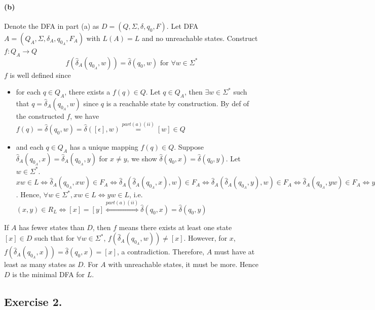 \documentclass[12pt]{article}
\begin{document}
\paragraph*{(b)} Denote the DFA in part (a) as \(D = (Q, \Sigma, \delta, q_{0}, F)\). Let DFA \(A = (Q_{A}, \Sigma, \delta_{A}, q_{0_{A}}, F_{A})\) with \(L(A) = L\) and no unreachable states. Construct \(f : Q_A \to Q\)
\begin{equation*}
  f(\hat{\delta}_A(q_{0_{A}}, w)) = \hat{\delta}(q_0, w) \text{ for } \forall w \in \Sigma^*
\end{equation*}
\(f\) is well defined since
\begin{itemize}
  \item for each \(q \in Q_{A}\), there exists a \(f(q) \in Q\). Let \(q \in Q_A\), then \(\exists w \in \Sigma^*\) such that \(q = \hat{\delta}_A(q_{0_{A}}, w)\) since \(q\) is a reachable state by construction. By def of the constructed \(f\), we have \(f(q) = \hat{\delta}(q_0, w) = \hat{\delta}([\epsilon], w) \overset{part (a)(ii)}{=} [w] \in Q\)
  \item and each \(q \in Q_{A}\) has a unique mapping \(f(q) \in Q\). Suppose \(\hat{\delta}_A(q_{0_{A}}, x) = \hat{\delta}_A(q_{0_{A}}, y)\) for \(x \neq y\), we show \(\hat{\delta}(q_0, x) = \hat{\delta}(q_0, y)\). Let \(w \in \Sigma^*\). \(xw \in L \Leftrightarrow \hat{\delta}_A(q_{0_{A}}, xw) \in F_A \Leftrightarrow \hat{\delta}_A(\hat{\delta}_A(q_{0_{A}}, x), w) \in F_A \Leftrightarrow \hat{\delta}_A(\hat{\delta}_A(q_{0_{A}}, y), w) \in F_A \Leftrightarrow \hat{\delta}_A(q_{0_{A}}, yw) \in F_A \Leftrightarrow yw \in L\). Hence, \(\forall w \in \Sigma^*, xw \in L \Leftrightarrow yw \in L\), i.e. \((x,y) \in R_L \Leftrightarrow [x] = [y] \overset{part (a)(ii)}{\Leftrightarrow} \hat{\delta}(q_0, x) = \hat{\delta}(q_0, y)\)
\end{itemize}
If \(A\) has fewer states than \(D\), then \(f\) means there exists at least one state \([x] \in D\) such that for \(\forall w \in \Sigma^*\), \(f(\hat{\delta}_A(q_{0_{A}}, w)) \neq [x]\). However, for \(x\), \(f(\hat{\delta}_A(q_{0_{A}}, x)) = \hat{\delta}(q_0, x) = [x]\), a contradiction. Therefore, \(A\) must have at least as many states as \(D\). For \(A\) with unreachable states, it must be more. Hence \(D\) is the minimal DFA for \(L\).

\subsection*{Exercise 2.} 
\end{document}
